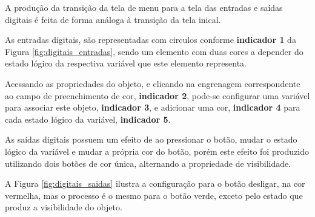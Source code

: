 A produção da transição da tela de menu para a tela das 
entradas e saídas digitais é feita de forma análoga à 
transição da tela inical. 



As entradas digitais, 
são representadas com circulos conforme 
\textbf{indicador 1} da Figura 
\ref{fig:digitais_entradas}, 
sendo um elemento com duas cores 
a depender do estado lógico da respectiva variável que este elemento representa. 

\begin{figure}[ht!]
	\centering
\end{figure}

Acessando as propriedades do objeto, 
e clicando na engrenagem correspondente ao 
campo de preenchimento de cor, 
\textbf{indicador 2}, 
pode-se configurar uma variável para associar este objeto,
\textbf{indicador 3}, 
e adicionar uma cor,
\textbf{indicador 4} 
para cada estado lógico da variável,
\textbf{indicador 5}.



As saídas digitais possuem um efeito de 
ao pressionar o botão, 
mudar o estado lógico da variável e 
mudar a própria cor do botão, 
porém este efeito foi produzido utilizando 
dois botões de cor única, 
alternando a propriedade de visibilidade.


A Figura \ref{fig:digitais_saidas} 
ilustra a configuração para o botão desligar, 
na cor vermelha, 
mas o processo é o mesmo para o botão verde, 
exceto pelo estado que produz a visibilidade do objeto.


